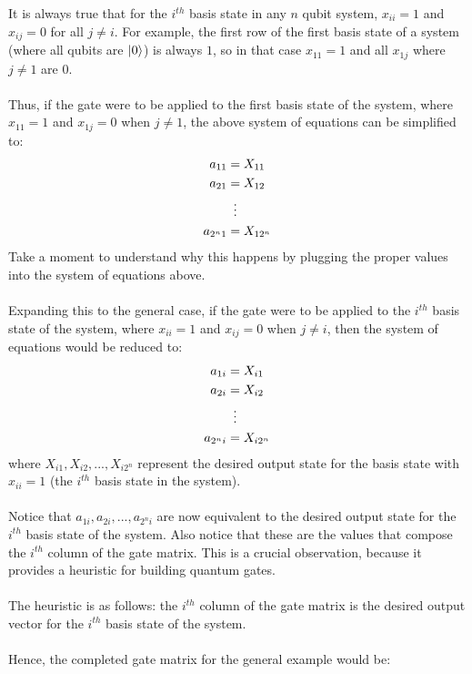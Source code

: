 \documentclass{article}
\begin{document}
It is always true that for the $i^{th}$ basis state in any $n$ qubit system, $x_{ii} = 1$ and $x_{ij} = 0$ for all $j \neq i$.
For example, the first row of the first basis state of a system (where all qubits are $\ket{0}$) is always $1$, so in that case $x_{11} = 1$ and all $x_{1j}$ where $j \neq 1$ are $0$.\\\\
Thus, if the gate were to be applied to the first basis state of the system, where $x_{11} = 1$ and $x_{1j} = 0$ when $j \neq 1$, the above system of equations can be simplified to:
\begin{align*}
	a_{11} &= X_{11} \\
	a_{21} &= X_{12} \\
	&\mathrel{\makebox[\widthof{=}]{\vdots}} \\
	a_{2^{n}1} &= X_{12^{n}}
\end{align*}
Take a moment to understand why this happens by plugging the proper values into the system of equations above.\\\\
Expanding this to the general case, if the gate were to be applied to the $i^{th}$ basis state of the system, where $x_{ii} = 1$ and $x_{ij} = 0$ when $j \neq i$, then the system of equations would be reduced to:
\begin{align*}
	a_{1i} &= X_{i1} \\
	a_{2i} &= X_{i2} \\
	&\mathrel{\makebox[\widthof{=}]{\vdots}} \\
	a_{2^{n}i} &= X_{i2^{n}}
\end{align*}
where $X_{i1}, X_{i2}, ..., X_{i2^{n}}$ represent the desired output state for the basis state with $x_{ii} = 1$ (the $i^{th}$ basis state in the system). \\\\
Notice that $a_{1i}, a_{2i}, ..., a_{2^{n}i}$ are now equivalent to the desired output state for the $i^{th}$ basis state of the system.
Also notice that these are the values that compose the $i^{th}$ column of the gate matrix.
This is a crucial observation, because it provides a heuristic for building quantum gates. \\\\
The heuristic is as follows: the $i^{th}$ column of the gate matrix is the desired output vector for the $i^{th}$ basis state of the system.\\\\
Hence, the completed gate matrix for the general example would be:
\end{document}
